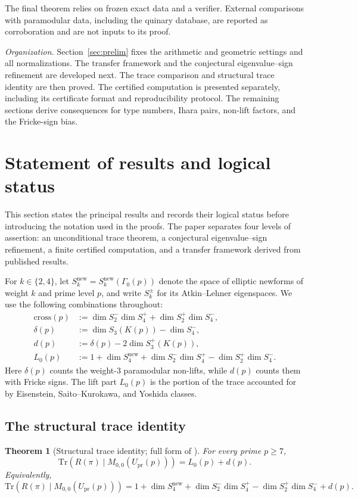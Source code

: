 \documentclass[11pt]{amsart}
\theoremstyle{plain}
\newtheorem{theorem}{Theorem}[section]
\theoremstyle{definition}
\newcommand{\Tr}{\mathrm{Tr}}
\newcommand{\Upr}{U_{\mathrm{pr}}}
\newcommand{\snew}{S^{\mathrm{new}}}
\providecommand{\Upr}{U_{\mathrm{pr}}}
\providecommand{\snew}{S^{\mathrm{new}}}
\begin{document}
	The final theorem relies on frozen exact data and a verifier. External
	comparisons with paramodular data, including the quinary database, are
	reported as corroboration and are not inputs to its proof.
	
	\smallskip
	\noindent\emph{Organization.}
	Section~\ref{sec:prelim} fixes the arithmetic and geometric settings and
	all normalizations. The transfer framework and the conjectural
	eigenvalue--sign refinement are developed next. The trace comparison and
	structural trace identity are then proved. The certified computation is
	presented separately, including its certificate format and reproducibility
	protocol. The remaining sections derive consequences for type numbers,
	Ihara pairs, non-lift factors, and the Fricke-sign bias.
	
	\section{Statement of results and logical status}
	\label{sec:statements}
	
	This section states the principal results and records their logical status
	before introducing the notation used in the proofs. The paper separates
	four levels of assertion: an unconditional trace theorem, a conjectural
	eigenvalue--sign refinement, a finite certified computation, and a
	transfer framework derived from published results.
	
	For $k\in\{2,4\}$, let $\snew_k=\snew_k(\Gamma_0(p))$ denote the space of
	elliptic newforms of weight $k$ and prime level $p$, and write
	$S_k^{\pm}$ for its Atkin--Lehner eigenspaces. We use the following
	combinations throughout:
	\begin{align}
		\mathrm{cross}(p)
		&:=\dim S_2^-\dim S_4^+ + \dim S_2^+\dim S_4^-,
		\label{eq:cross-def}\\
		\delta(p)
		&:=\dim S_3(K(p))-\dim S_4^-,
		\label{eq:delta-def}\\
		d(p)
		&:=\delta(p)-2\dim S_3^+(K(p)),
		\label{eq:d-def}\\
		L_0(p)
		&:=1+\dim\snew_4+\dim S_2^-\dim S_4^+-\dim S_2^+\dim S_4^-.
		\label{eq:L0-def}
	\end{align}
	Here $\delta(p)$ counts the weight-$3$ paramodular non-lifts, while $d(p)$
	counts them with Fricke signs. The lift part $L_0(p)$ is the portion of the
	trace accounted for by Eisenstein, Saito--Kurokawa, and Yoshida classes.
	
	\subsection{The structural trace identity}
	\begin{theorem}[Structural trace identity; full form of ]\label{thm:structural-trace}
		For every prime $p\ge7$,
		\begin{equation}\label{eq:structural-trace}
			\Tr\!\left(R(\pi)\mid M_{0,0}(\Upr(p))\right)=L_0(p)+d(p).
		\end{equation}
		Equivalently,
		\[
		\Tr\!\left(R(\pi)\mid M_{0,0}(\Upr(p))\right)
		=
		1+\dim\snew_4
		+\dim S_2^-\dim S_4^+
		-\dim S_2^+\dim S_4^-
		+d(p).
		\]
	\end{theorem}
	
\end{document}
